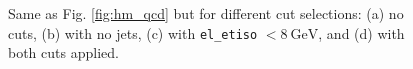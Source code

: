 \documentclass[a4paper]{report}
\numberwithin{equation}{section}
\begin{document}
\begin{figure}[htb!]
	\centering
	\quad
	\centering
    \quad
	\centering
    \quad
	\centering
	\caption{Same as Fig. \ref{fig:hm_qcd} but for different cut selections: (a) no cuts, (b) with no jets, (c) with 
    \texttt{el\_etiso} $< \SI{8}{\giga\electronvolt}$, and (d) with both cuts applied.}
	\label{fig:hm_cuts}
\end{figure}
\end{document}
